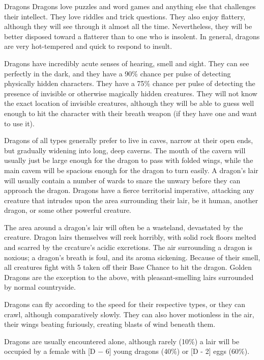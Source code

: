 \begin{mmgroup}{Dragons}
Dragons love puzzles and word games and anything else that challenges
their intellect.  They love riddles and trick questions.  They also
enjoy flattery, although they will see through it almost all the
time. Nevertheless, they will be better disposed toward a flatterer
than to one who is insolent.  In general, dragons are very
hot-tempered and quick to respond to insult.

Dragons have incredibly acute senses of hearing, smell and sight. They
can see perfectly in the dark, and they have a 90\% chance per pulse of
detecting physically hidden characters.  They have a 75\% chance per
pulse of detecting the presence of invisible or otherwise magically
hidden creatures.  They will not know the exact location of invisible
creatures, although they will be able to guess well enough to hit the
character with their breath weapon (if they have one and want to use
it).

Dragons of all types generally prefer to live in caves, narrow at
their open ends, but gradually widening into long, deep caverns.  The
mouth of the cavern will usually just be large enough for the dragon
to pass with folded wings, while the main cavem will be spacious
enough for the dragon to turn easily.  A dragon's lair will usually
contain a number of wards to snare the unwary before they can approach
the dragon.  Dragons have a fierce territorial imperative, attacking
any creature that intrudes upon the area surrounding their lair, be it
human, another dragon, or some other powerful creature.

The area around a dragon's lair will often be a wasteland, devastated
by the creature.  Dragon lairs themselves will reek horribly, with
solid rock floors melted and scarred by the crcature's acidic
excretions.  The air surrounding a dragon is noxious; a dragon's
breath is foul, and its aroma sickening.  Because of their smell, all
creatures fight with 5 taken off their Base Chance to hit the dragon.
Golden Dragons are the exception to the above, with pleasant-smelling
lairs surrounded by normal countryside.

Dragons can fly according to the speed for their respective types, or
they can crawl, although comparatively slowly.  They can also hover
motionless in the air, their wings beating furiously, creating blasts
of wind beneath them.

Dragons are usually encountered alone, although rarely (10\%) a lair
will be occupied by a female with [D − 6] young dragons (40\%) or [D -
2] eggs (60\%).


\end{mmgroup}
